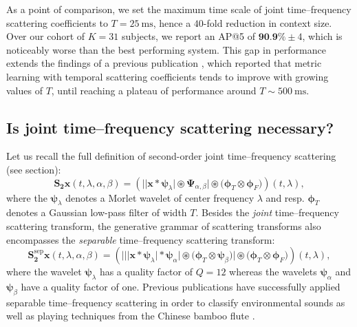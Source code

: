 \documentclass{bmcart}
\newcommand{\lnameref}[1]{%
\bgroup
\let\nmu\MakeLowercase
\nameref{#1}\egroup}
\newcommand{\nmu}{}
\begin{document}
As a point of comparison, we set the maximum time scale of joint time--frequency scattering coefficients to $T=\SI{25}{\milli\second}$, hence a $40$-fold reduction in context size.
Over our cohort of $K=31$ subjects, we report an AP@5 of $\textbf{90.9\%} \pm 4$, which is noticeably worse than the best performing system.
This gap in performance extends the findings of a previous publication \cite{lostanlen2018extended}, which reported that metric learning with temporal scattering coefficients tends to improve with growing values of $T$, until reaching a plateau of performance around $T\sim\SI{500}{\milli\second}$.


\subsection*{Is joint time--frequency scattering necessary?}

Let us recall the full definition of second-order joint time--frequency scattering (see \lnameref{sec:methods} section):
\begin{equation}
\mathbf{S_2}\boldsymbol{x}(t,\lambda,\alpha,\beta) =
\left(
\Big\vert
\big\vert
\boldsymbol{x} \ast \boldsymbol{\psi}_{\lambda}
\big\vert
\circledast
\boldsymbol{\Psi}_{\alpha,\beta}
\Big\vert
\circledast
\big(\boldsymbol{\phi}_{T} \otimes \boldsymbol{\phi}_{F})
\right)(t,\lambda),
\label{eq:joint-scattering}
\end{equation}
where the $\boldsymbol{\psi}_{\lambda}$ denotes a Morlet wavelet of center frequency $\lambda$ and resp. $\boldsymbol{\phi}_T$ denotes a Gaussian low-pass filter of width $T$.
Besides the \emph{joint} time--frequency scattering transform, the generative grammar of scattering transforms \cite{lostanlen2019chapter} also encompasses the \emph{separable} time--frequency scattering transform:
\begin{equation}
\mathbf{S_2^{\mathrm{sep}}}\boldsymbol{x}(t,\lambda,\alpha,\beta) =
\left(
\bigg\vert
\Big\vert
\big\vert
\boldsymbol{x} \ast \boldsymbol{\psi}_{\lambda}
\big\vert
\ast
\boldsymbol{\psi}_{\alpha}
\Big\vert
\circledast
\big(\boldsymbol{\phi}_{T} \otimes \boldsymbol{\psi}_{\beta}\big)
\bigg\vert
\circledast
\big(\boldsymbol{\phi}_{T} \otimes \boldsymbol{\phi}_F\big)
\right)(t, \lambda),
\label{eq:separable-scattering}
\end{equation}
where the wavelet $\boldsymbol{\psi}_{\lambda}$ has a quality factor of $Q=12$ whereas the wavelets $\boldsymbol{\psi}_{\alpha}$ and $\boldsymbol{\psi}_{\beta}$ have a quality factor of one.
Previous publications have successfully applied separable time--frequency scattering in order to classify environmental sounds \cite{bauge2013icassp} as well as playing techniques from the Chinese bamboo flute \cite{wang2019ismir}.
\end{document}
